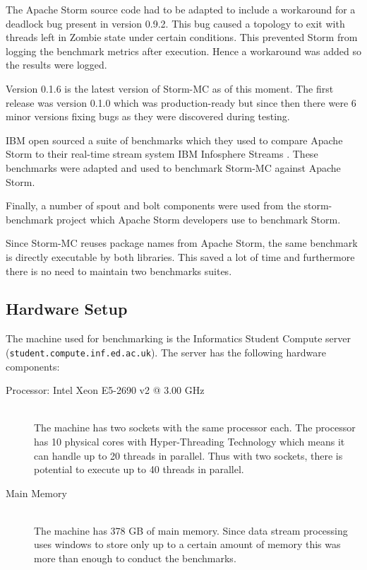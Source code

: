 The Apache Storm source code had to be adapted to include a workaround for a deadlock bug present in version 0.9.2. This bug caused a topology to exit with threads left in Zombie state under certain conditions. This prevented Storm from logging the benchmark metrics after execution. Hence a workaround was added so the results were logged.

Version 0.1.6 is the latest version of Storm-MC as of this moment. The first release was version 0.1.0 which was production-ready but since then there were 6 minor versions fixing bugs as they were discovered during testing.

IBM open sourced a suite of benchmarks which they used to compare Apache Storm to their real-time stream system IBM Infosphere Streams \citep{InfoSphereStreams}. These benchmarks were adapted and used to benchmark Storm-MC against Apache Storm.

Finally, a number of spout and bolt components were used from the storm-benchmark project which Apache Storm developers use to benchmark Storm.

Since Storm-MC reuses package names from Apache Storm, the same benchmark is directly executable by both libraries. This saved a lot of time and furthermore there is no need to maintain two benchmarks suites.


\subsection{Hardware Setup}

The machine used for benchmarking is the Informatics Student Compute server (\texttt{student.compute.inf.ed.ac.uk}). The server has the following hardware components:

\begin{description}
	\item[Processor: Intel\textsuperscript{\textregistered} Xeon\textsuperscript{\textregistered} E5-2690 v2 @ 3.00 GHz] \hfill \\
	The machine has two sockets with the same processor each. The processor has 10 physical cores with Hyper-Threading Technology which means it can handle up to 20 threads in parallel. Thus with two sockets, there is potential to execute up to 40 threads in parallel.
	\item[Main Memory] \hfill \\
	The machine has 378 GB of main memory. Since data stream processing uses windows to store only up to a certain amount of memory this was more than enough to conduct the benchmarks.
\end{description}

